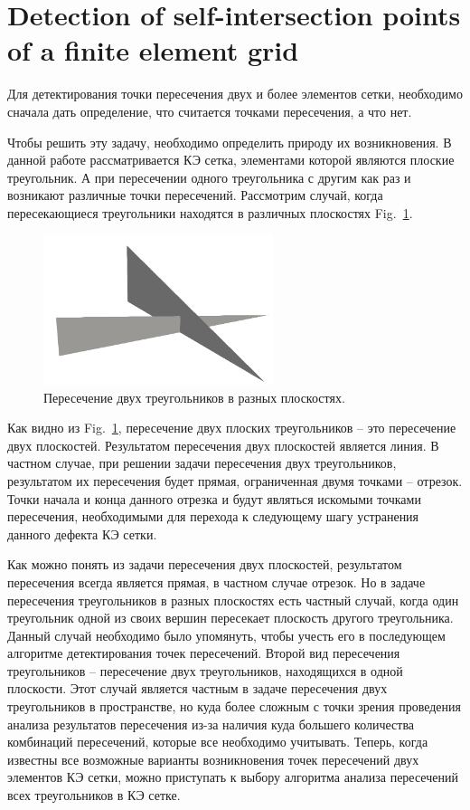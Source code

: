 \documentclass[
11pt,%
tightenlines,%
twoside,%
onecolumn,%
nofloats,%
nobibnotes,%
nofootinbib,%
superscriptaddress,%
noshowpacs,%
centertags]%
{revtex4}
\begin{document}
\section{Detection of self-intersection points of a finite element grid}

Для детектирования точки пересечения двух и более элементов сетки, необходимо сначала дать определение, что считается точками пересечения, а что нет.

Чтобы решить эту задачу, необходимо определить природу их возникновения.
В данной работе рассматривается КЭ сетка, элементами которой являются плоские треугольник. А при пересечении одного треугольника с другим как раз и возникают различные точки пересечений.
Рассмотрим случай, когда пересекающиеся треугольники находятся в различных плоскостях Fig.~\ref{fig:2}. 

\begin{figure}[h]
\includegraphics[width=0.6\textwidth]{pics/pic_2.png}
\caption{Пересечение двух треугольников в разных плоскостях.}\label{fig:2}
\end{figure}

Как видно из Fig.~\ref{fig:2}, пересечение двух плоских треугольников – это пересечение двух плоскостей. Результатом пересечения двух плоскостей является линия. В частном случае, при решении задачи пересечения двух треугольников, результатом их пересечения будет прямая, ограниченная двумя точками – отрезок. Точки начала и конца данного отрезка и будут являться искомыми точками пересечения, необходимыми для перехода к следующему шагу устранения данного дефекта КЭ сетки.

Как можно понять из задачи пересечения двух плоскостей, результатом пересечения всегда является прямая, в частном случае отрезок. Но в задаче пересечения треугольников в разных плоскостях есть частный случай, когда один треугольник одной из своих вершин пересекает плоскость другого треугольника. Данный случай необходимо было упомянуть, чтобы учесть его в последующем алгоритме детектирования точек пересечений.
Второй вид пересечения треугольников – пересечение двух треугольников, находящихся в одной плоскости. Этот случай является частным в задаче пересечения двух треугольников в пространстве, но куда более сложным с точки зрения проведения анализа результатов пересечения из-за наличия куда большего количества комбинаций пересечений, которые все необходимо учитывать. 
Теперь, когда известны все возможные варианты возникновения точек пересечений двух элементов КЭ сетки, можно приступать к выбору алгоритма анализа пересечений всех треугольников в КЭ сетке.
\end{document}
